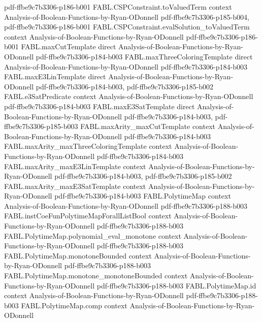 \begin{theorem}
  {pdf-ffbe9c7b3306-p186-b001}
\proofstep
  {FABL.CSPConstraint.toValuedTerm}
  {context}
  {Analysis-of-Boolean-Functions-by-Ryan-ODonnell}
  {pdf-ffbe9c7b3306-p185-b004,
    pdf-ffbe9c7b3306-p186-b001}
\proofstep
  {FABL.CSPConstraint.evalSolution_toValuedTerm}
  {context}
  {Analysis-of-Boolean-Functions-by-Ryan-ODonnell}
  {pdf-ffbe9c7b3306-p186-b001}
\proofstep
  {FABL.maxCutTemplate}
  {direct}
  {Analysis-of-Boolean-Functions-by-Ryan-ODonnell}
  {pdf-ffbe9c7b3306-p184-b003}
\proofstep
  {FABL.maxThreeColoringTemplate}
  {direct}
  {Analysis-of-Boolean-Functions-by-Ryan-ODonnell}
  {pdf-ffbe9c7b3306-p184-b003}
\proofstep
  {FABL.maxE3LinTemplate}
  {direct}
  {Analysis-of-Boolean-Functions-by-Ryan-ODonnell}
  {pdf-ffbe9c7b3306-p184-b003,
    pdf-ffbe9c7b3306-p185-b002}
\proofstep
  {FABL.e3SatPredicate}
  {context}
  {Analysis-of-Boolean-Functions-by-Ryan-ODonnell}
  {pdf-ffbe9c7b3306-p184-b003}
\proofstep
  {FABL.maxE3SatTemplate}
  {direct}
  {Analysis-of-Boolean-Functions-by-Ryan-ODonnell}
  {pdf-ffbe9c7b3306-p184-b003,
    pdf-ffbe9c7b3306-p185-b003}
\proofstep
  {FABL.maxArity_maxCutTemplate}
  {context}
  {Analysis-of-Boolean-Functions-by-Ryan-ODonnell}
  {pdf-ffbe9c7b3306-p184-b003}
\proofstep
  {FABL.maxArity_maxThreeColoringTemplate}
  {context}
  {Analysis-of-Boolean-Functions-by-Ryan-ODonnell}
  {pdf-ffbe9c7b3306-p184-b003}
\proofstep
  {FABL.maxArity_maxE3LinTemplate}
  {context}
  {Analysis-of-Boolean-Functions-by-Ryan-ODonnell}
  {pdf-ffbe9c7b3306-p184-b003,
    pdf-ffbe9c7b3306-p185-b002}
\proofstep
  {FABL.maxArity_maxE3SatTemplate}
  {context}
  {Analysis-of-Boolean-Functions-by-Ryan-ODonnell}
  {pdf-ffbe9c7b3306-p184-b003}
\proofstep
  {FABL.PolytimeMap}
  {context}
  {Analysis-of-Boolean-Functions-by-Ryan-ODonnell}
  {pdf-ffbe9c7b3306-p188-b003}
\proofstep
  {FABL.instCoeFunPolytimeMapForallListBool}
  {context}
  {Analysis-of-Boolean-Functions-by-Ryan-ODonnell}
  {pdf-ffbe9c7b3306-p188-b003}
\proofstep
  {FABL.PolytimeMap.polynomial_eval_monotone}
  {context}
  {Analysis-of-Boolean-Functions-by-Ryan-ODonnell}
  {pdf-ffbe9c7b3306-p188-b003}
\proofstep
  {FABL.PolytimeMap.monotoneBounded}
  {context}
  {Analysis-of-Boolean-Functions-by-Ryan-ODonnell}
  {pdf-ffbe9c7b3306-p188-b003}
\proofstep
  {FABL.PolytimeMap.monotone_monotoneBounded}
  {context}
  {Analysis-of-Boolean-Functions-by-Ryan-ODonnell}
  {pdf-ffbe9c7b3306-p188-b003}
\proofstep
  {FABL.PolytimeMap.id}
  {context}
  {Analysis-of-Boolean-Functions-by-Ryan-ODonnell}
  {pdf-ffbe9c7b3306-p188-b003}
\proofstep
  {FABL.PolytimeMap.comp}
  {context}
  {Analysis-of-Boolean-Functions-by-Ryan-ODonnell}

\end{theorem}
